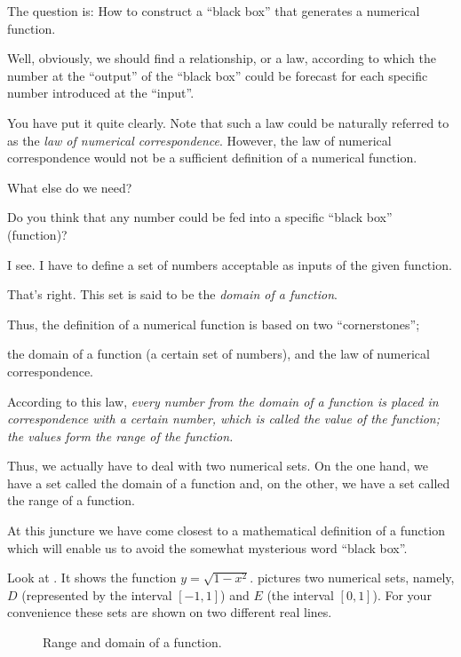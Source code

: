 {The question is: How to construct a ``black box'' that generates a numerical function.

\rdr Well, obviously, we should find a relationship, or a law, according to which the number at the ``output'' of the ``black box'' could be forecast for each specific number introduced at the ``input''.

\athr You have put it quite clearly. Note that such a law could be naturally referred to as the \emph{law of numerical correspondence}. However, the law of numerical correspondence would not be a sufficient definition of a numerical function.

\rdr What else do we need?

\athr Do you think that any number could be fed into a specific ``black box'' (function)?

\rdr I see. I have to define a set of numbers acceptable as inputs of the given function.

\athr That's right. This set is said to be the \emph{domain of a function}.

Thus, the definition of a numerical function is based on two ``cornerstones'';

the domain of a function (a certain set of numbers), and the law of numerical correspondence. 

According to this law, \emph{every number from the domain of
a function is placed in correspondence with a certain number, which is called the value of the function; the values form the range of the function.}

\rdr Thus, we actually have to deal with two numerical sets. On the one hand, we have a set called the domain of a function and, on  the other, we have a set called the range of a function.

\athr At this juncture we have come closest to a mathematical definition of a function which will enable us to avoid the somewhat mysterious word ``black box''.

Look at . It shows the function $y = \sqrt{1 - x^{2}}$.   pictures two numerical sets, namely, $D$ (represented by the interval $[-1, 1]$) and	 $E$ (the interval $[0, 1]$). For your convenience these sets are shown on two different real lines.

\begin{figure}[!h]
\centering

\caption{Range and domain of a function.}
\label{fig-13}
\end{figure}

}
